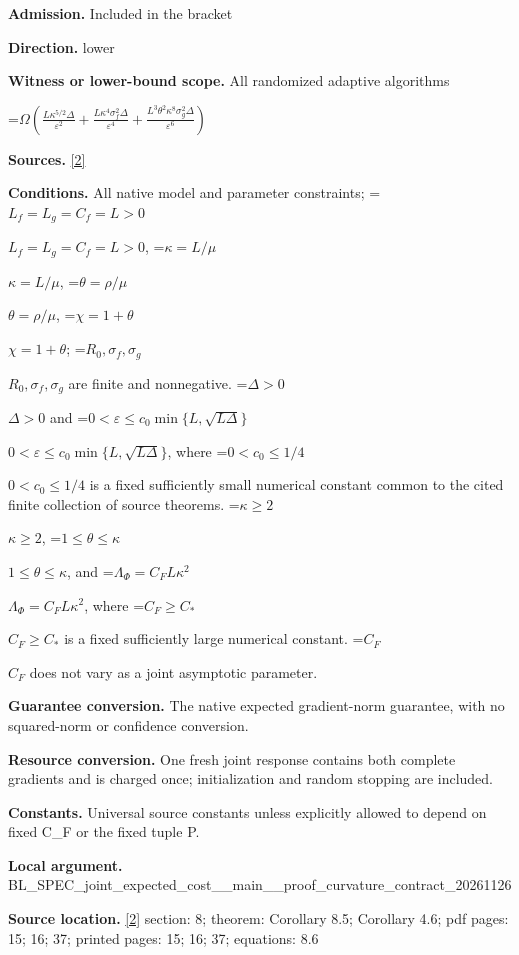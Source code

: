 \documentclass[10pt,a4paper]{article}
\newcommand{\AtlasMath}[1]{\par\begingroup\centering\setbox0=\hbox{$\displaystyle #1$}\ifdim\wd0>1.4\linewidth\typeout{ATLAS WIDE FORMULA: \the\wd0}\fi\ifdim\wd0>\linewidth\resizebox{\linewidth}{!}{\box0}\else\box0\fi\par\endgroup}
\newcommand{\AtlasInlineMath}[1]{\begingroup\setbox0=\hbox{$#1$}\ifdim\wd0>.4\linewidth\endgroup\AtlasMath{#1}\else\endgroup$#1$\fi}
\begin{document}
\textbf{Admission.} Included in the bracket



\textbf{Direction.} lower



\textbf{Witness or lower-bound scope.} All randomized adaptive algorithms



\AtlasMath{\Omega\!\left(\frac{L\kappa^{5/2}\Delta}{\varepsilon^2}+\frac{L\kappa^4\sigma_f^2\Delta}{\varepsilon^4}+\frac{L^3\theta^2\kappa^8\sigma_g^2\Delta}{\varepsilon^6}\right)}


\textbf{Sources.} \href{https://github.com/WU-Wendao/Colombo/blob/main/colombo_sensorium/Complexity_altas/data/sources/colombo/SFO_JOINT_20261126/manuscript.pdf}{[2]}



\textbf{Conditions.} All native model and parameter constraints; \AtlasInlineMath{L_f=L_g=C_f=L>0}, \AtlasInlineMath{\kappa=L/\mu}, \AtlasInlineMath{\theta=\rho/\mu}, \AtlasInlineMath{\chi=1+\theta}; \AtlasInlineMath{R_0,\sigma_f,\sigma_g} are finite and nonnegative. \AtlasInlineMath{\Delta>0} and \AtlasInlineMath{0<\varepsilon\le c_0\min\{L,\sqrt{L\Delta}\}}, where \AtlasInlineMath{0<c_0\le1/4} is a fixed sufficiently small numerical constant common to the cited finite collection of source theorems. \AtlasInlineMath{\kappa\ge2}, \AtlasInlineMath{1\le\theta\le\kappa}, and \AtlasInlineMath{\Lambda_\Phi=C_F L\kappa^2}, where \AtlasInlineMath{C_F\ge C_*} is a fixed sufficiently large numerical constant. \AtlasInlineMath{C_F} does not vary as a joint asymptotic parameter.



\textbf{Guarantee conversion.} The native expected gradient-norm guarantee, with no squared-norm or confidence conversion.



\textbf{Resource conversion.} One fresh joint response contains both complete gradients and is charged once; initialization and random stopping are included.



\textbf{Constants.} Universal source constants unless explicitly allowed to depend on fixed C\_F or the fixed tuple P.



\textbf{Local argument.} BL\_SPEC\_joint\_expected\_c\allowbreak{}ost\_\_main\_\_proof\_curvatu\allowbreak{}re\_contract\_20261126



\textbf{Source location.} \href{https://github.com/WU-Wendao/Colombo/blob/main/colombo_sensorium/Complexity_altas/data/sources/colombo/SFO_JOINT_20261126/manuscript.pdf}{[2]} section: 8; theorem: Corollary 8.5; Corollary 4.6; pdf pages: 15; 16; 37; printed pages: 15; 16; 37; equations: 8.6
\end{document}
